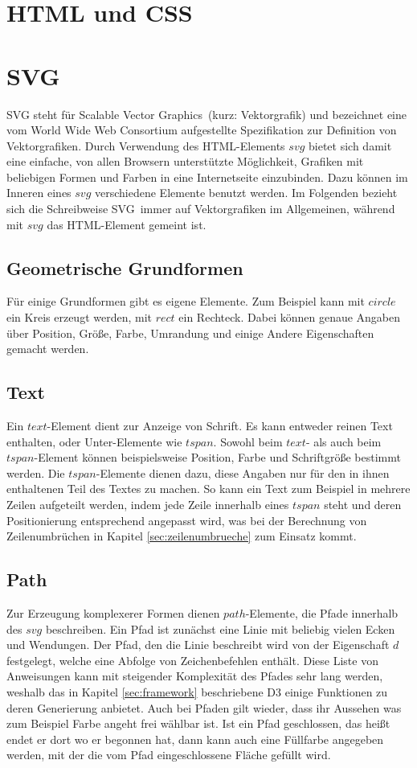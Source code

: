 \section{HTML und CSS}

\section{SVG}\label{sec:svg}
SVG steht für \glqq Scalable Vector Graphics\grqq\ (kurz: Vektorgrafik) und bezeichnet eine vom World Wide Web Consortium aufgestellte Spezifikation zur Definition von Vektorgrafiken.  Durch Verwendung des HTML-Elements $svg$ bietet sich damit eine einfache, von allen Browsern unterstützte Möglichkeit, Grafiken mit beliebigen Formen und Farben in eine Internetseite einzubinden. Dazu können im Inneren eines $svg$ verschiedene Elemente benutzt werden. Im Folgenden bezieht sich die Schreibweise \glqq SVG\grqq\ immer auf Vektorgrafiken im Allgemeinen, während mit $svg$ das HTML-Element gemeint ist.

\subsection{Geometrische Grundformen}
Für einige Grundformen gibt es eigene Elemente. Zum Beispiel kann mit $circle$ ein Kreis erzeugt werden, mit $rect$ ein Rechteck. Dabei können genaue Angaben über Position, Größe, Farbe, Umrandung und einige Andere Eigenschaften gemacht werden.

\subsection{Text}
Ein $text$-Element dient zur Anzeige von Schrift. Es kann entweder reinen Text enthalten, oder Unter-Elemente wie $tspan$. Sowohl beim $text$- als auch beim $tspan$-Element können beispielsweise Position, Farbe und Schriftgröße bestimmt werden. Die $tspan$-Elemente dienen dazu, diese Angaben nur für den in ihnen enthaltenen Teil des Textes zu machen. So kann ein Text zum Beispiel in mehrere Zeilen aufgeteilt werden, indem jede Zeile innerhalb eines $tspan$ steht und deren Positionierung entsprechend angepasst wird, was bei der Berechnung von Zeilenumbrüchen in Kapitel \ref{sec:zeilenumbrueche} zum Einsatz kommt.

\subsection{Path}
Zur Erzeugung komplexerer Formen dienen $path$-Elemente, die Pfade innerhalb des $svg$ beschreiben. Ein Pfad ist zunächst eine Linie mit beliebig vielen Ecken und Wendungen. Der Pfad, den die Linie beschreibt wird von der Eigenschaft $d$ festgelegt, welche eine Abfolge von Zeichenbefehlen enthält. Diese Liste von Anweisungen kann mit steigender Komplexität des Pfades sehr lang werden, weshalb das in Kapitel \ref{sec:framework} beschriebene D3 einige Funktionen zu deren Generierung anbietet. Auch bei Pfaden gilt wieder, dass ihr Aussehen was zum Beispiel Farbe angeht frei wählbar ist. Ist ein Pfad geschlossen, das heißt endet er dort wo er begonnen hat, dann kann auch eine Füllfarbe angegeben werden, mit der die vom Pfad eingeschlossene Fläche gefüllt wird.

